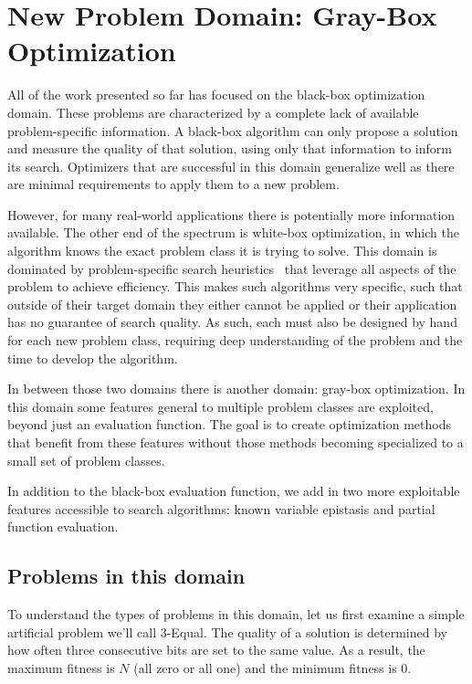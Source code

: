 \chapter{New Problem Domain: Gray-Box Optimization}
\label{chap-graybox}
All of the work presented so far has focused on the black-box optimization
domain. These problems are characterized by a complete lack of available
problem-specific information.
A black-box algorithm can only propose a solution and measure the
quality of that solution, using only that information to inform its search.
Optimizers that are successful in this domain generalize well
as there are minimal requirements to apply them to a new problem.

However, for many real-world applications there is potentially more information
available. The other end of the spectrum is white-box optimization, in which
the algorithm knows the exact problem class it is trying to solve. This domain
is dominated by problem-specific search
heuristics~\cite{een:2004:satsolver,sherrington:1975:isingsolver,wright:2000:solvingnk} that
leverage all aspects of the problem to achieve efficiency. This makes such
algorithms very specific, such that outside of their target domain they
either cannot be applied or
their application has no guarantee of search quality.
As such,
each must also be designed by hand for each new problem class, requiring
deep understanding of the problem and the time to develop the algorithm.

In between those two domains there is another domain: gray-box optimization. In this
domain some features general to multiple problem classes are exploited, beyond
just an evaluation function. The goal is to create optimization methods that
benefit from these features without those methods becoming specialized to
a small set of problem classes.

In addition to the black-box evaluation function, we
add in two more exploitable features accessible to search algorithms:
known variable epistasis and partial function evaluation.

\section{Problems in this domain}
To understand the types of problems in this domain, let us first examine
a simple artificial problem we'll call 3-Equal. The quality
of a solution is determined by how often three consecutive bits are set
to the same value. As a result,
the maximum fitness is $N$ (all zero or all one) and the minimum fitness
is 0.

